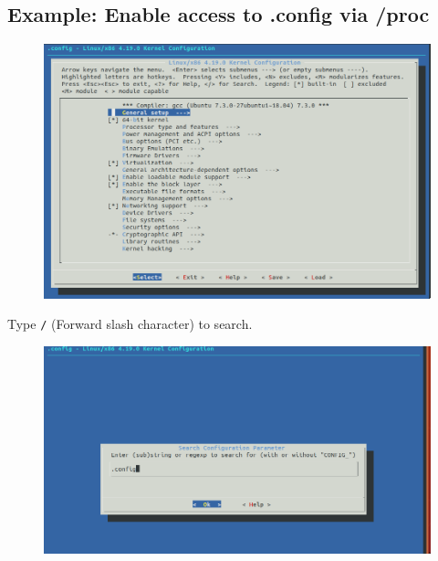 \documentclass{beamer}
\begin{document}
\subsection{Example: Enable access to .config via /proc}
\begin{frame}
  \begin{figure}[h!]
    \centering
    \includegraphics[scale=0.3]{images/proc-config-0.png}
  \end{figure}
\end{frame}

\begin{frame}
  Type \texttt{/} (Forward slash character) to search.
  \begin{figure}
    \centering
    \includegraphics[scale=0.4]{images/proc-config-0-1.png}
  \end{figure}
\end{frame}
\end{document}
